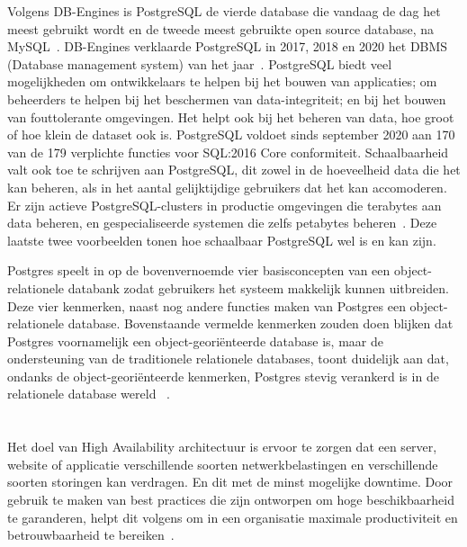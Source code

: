 Volgens DB-Engines is PostgreSQL de vierde database die vandaag de dag het meest gebruikt wordt en de tweede meest gebruikte open source database, na MySQL~\autocite{DBEngines2021}. DB-Engines verklaarde PostgreSQL in 2017, 2018 en 2020 het DBMS (Database management system) van het jaar~\autocite{DBEngines2021a}.
PostgreSQL biedt veel mogelijkheden om ontwikkelaars te helpen bij het bouwen van applicaties; om beheerders te helpen bij het beschermen van data-integriteit; en bij het bouwen van fouttolerante omgevingen. Het helpt ook bij het beheren van data, hoe groot of hoe klein de dataset ook is. PostgreSQL voldoet sinds september 2020 aan 170 van de 179 verplichte functies voor SQL:2016 Core conformiteit. Schaalbaarheid valt ook toe te schrijven aan PostgreSQL, dit zowel in de hoeveelheid data die het kan beheren, als in het aantal gelijktijdige gebruikers dat het kan accomoderen. Er zijn actieve PostgreSQL-clusters in productie omgevingen die terabytes aan data beheren, en gespecialiseerde systemen die zelfs petabytes beheren~\autocite{PostgreSQL2021}. Deze laatste twee voorbeelden tonen hoe schaalbaar PostgreSQL wel is en kan zijn.

Postgres speelt in op de bovenvernoemde vier basisconcepten van een object-relationele databank zodat gebruikers het systeem makkelijk kunnen uitbreiden. Deze vier kenmerken, naast nog andere functies maken van Postgres een object-relationele database. Bovenstaande vermelde kenmerken zouden doen blijken dat Postgres voornamelijk een object-georiënteerde database is, maar de ondersteuning van de traditionele relationele databases, toont duidelijk aan dat, ondanks de object-georiënteerde kenmerken, Postgres stevig verankerd is in de relationele database wereld ~\autocite{PostgreSQL2021a}.




\section{}
\label{sec:High Availability}

Het doel van High Availability architectuur is ervoor te zorgen dat een server, website of applicatie verschillende soorten netwerkbelastingen en verschillende soorten storingen kan verdragen. En dit met de minst mogelijke downtime. Door gebruik te maken van best practices die zijn ontworpen om hoge beschikbaarheid te garanderen, helpt dit volgens \textcite{2017} om in een organisatie maximale productiviteit en betrouwbaarheid te bereiken~\autocite{2017}.

